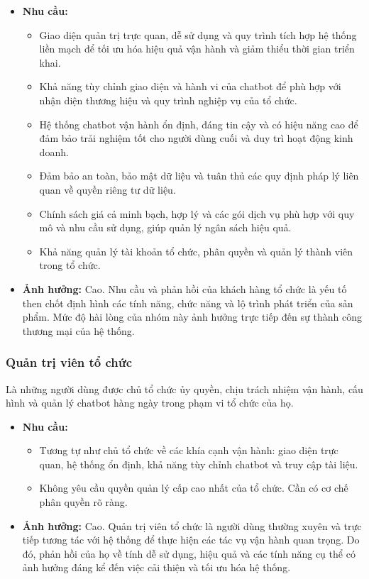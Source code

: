 \begin{itemize}
    \item \textbf{Nhu cầu:}
    \begin{itemize}
        \item Giao diện quản trị trực quan, dễ sử dụng và quy trình tích hợp hệ thống liền mạch để tối ưu hóa hiệu quả vận hành và giảm thiểu thời gian triển khai.
        \item Khả năng tùy chỉnh giao diện và hành vi của chatbot để phù hợp với nhận diện thương hiệu và quy trình nghiệp vụ của tổ chức.
        \item Hệ thống chatbot vận hành ổn định, đáng tin cậy và có hiệu năng cao để đảm bảo trải nghiệm tốt cho người dùng cuối và duy trì hoạt động kinh doanh.
        \item Đảm bảo an toàn, bảo mật dữ liệu và tuân thủ các quy định pháp lý liên quan về quyền riêng tư dữ liệu.
        \item Chính sách giá cả minh bạch, hợp lý và các gói dịch vụ phù hợp với quy mô và nhu cầu sử dụng, giúp quản lý ngân sách hiệu quả.
        \item Khả năng quản lý tài khoản tổ chức, phân quyền và quản lý thành viên trong tổ chức.
    \end{itemize}
    \item \textbf{Ảnh hưởng:} Cao. Nhu cầu và phản hồi của khách hàng tổ chức là yếu tố then chốt định hình các tính năng, chức năng và lộ trình phát triển của sản phẩm. Mức độ hài lòng của nhóm này ảnh hưởng trực tiếp đến sự thành công thương mại của hệ thống.
\end{itemize}

\subsubsection{Quản trị viên tổ chức}

Là những người dùng được chủ tổ chức ủy quyền, chịu trách nhiệm vận hành, cấu hình và quản lý chatbot hàng ngày trong phạm vi tổ chức của họ.

\begin{itemize}
    \item \textbf{Nhu cầu:}
    \begin{itemize}
        \item Tương tự như chủ tổ chức về các khía cạnh vận hành: giao diện trực quan, hệ thống ổn định, khả năng tùy chỉnh chatbot và truy cập tài liệu.
        \item Không yêu cầu quyền quản lý cấp cao nhất của tổ chức. Cần có cơ chế phân quyền rõ ràng.
    \end{itemize}
    \item \textbf{Ảnh hưởng:} Cao. Quản trị viên tổ chức là người dùng thường xuyên và trực tiếp tương tác với hệ thống để thực hiện các tác vụ vận hành quan trọng. Do đó, phản hồi của họ về tính dễ sử dụng, hiệu quả và các tính năng cụ thể có ảnh hưởng đáng kể đến việc cải thiện và tối ưu hóa hệ thống.
\end{itemize}

